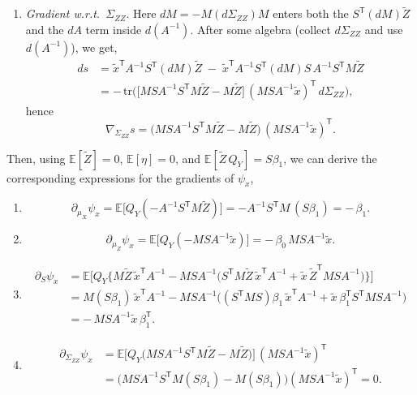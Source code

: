 \documentclass[12pt]{article}
\newcommand{\E}{\mathbb{E}}
\newcommand{\T}{\mathsf{T}} %
\begin{document}
\begin{enumerate}
 \item \textit{Gradient w.r.t.\ $\Sigma_{ZZ}$}.
Here $dM=-M(d\Sigma_{ZZ})M$ enters both the $S^{\T}(dM)\widetilde Z$ and the $dA$ term inside $d(A^{-1})$. After some algebra (collect $d\Sigma_{ZZ}$ and use $d(A^{-1})$), we get,
\begin{align*}
ds
&= \tilde x^{\T}A^{-1}S^{\T}(dM)\widetilde Z
\;-\;\tilde x^{\T}A^{-1}S^{\T}(dM)S\,A^{-1} S^{\T}M\widetilde Z\\
&= -\,\mathrm{tr}\!\Big( \big[M S A^{-1} S^{\T}M\widetilde Z - M\widetilde Z\big]\,(M S A^{-1}\tilde x)^{\T}\, d\Sigma_{ZZ}\Big),
\end{align*}
hence
\[
\boxed{\;\nabla_{\Sigma_{ZZ}} s
= \big(M S A^{-1} S^{\T}M\widetilde Z - M\widetilde Z\big)\,(M S A^{-1}\tilde x)^{\T}.\;}
\]
\end{enumerate}

Then, using $\E[\widetilde Z]=0$, $\E[\eta]=0$, and $\E[\widetilde Z\,Q_Y]=S\beta_1$, we can derive the corresponding expressions for the gradients of $\psi_x$,

\begin{enumerate}
\item \[
\partial_{\mu_X}\psi_x
= \E\big[Q_Y(-A^{-1}S^{\T}M\widetilde Z)\big]
= -A^{-1}S^{\T}M\,(S\beta_1) = -\,\beta_1.
\]

\item \[
\partial_{\mu_Z}\psi_x
= \E\big[Q_Y(-M S A^{-1}\tilde x)\big]
= -\,\beta_0\,M S A^{-1}\tilde x.
\]

\item \begin{align*}
\partial_{S}\psi_x
&= \E\Big[Q_Y\Big\{M\widetilde Z\,\tilde x^{\T}A^{-1}
- M S A^{-1}\big(S^{\T}M\widetilde Z\,\tilde x^{\T}A^{-1}+\tilde x\,\widetilde Z^{\T} M S A^{-1}\big)\Big\}\Big]\\
&= M(S\beta_1)\,\tilde x^{\T}A^{-1}
- M S A^{-1}\Big((S^{\T}MS)\beta_1\,\tilde x^{\T}A^{-1}+\tilde x\,\beta_1^{\T}S^{\T}MS A^{-1}\Big)\\
&= -\,M S A^{-1}\tilde x\,\beta_1^{\T}.
\end{align*}

\item \begin{align*}
\partial_{\Sigma_{ZZ}}\psi_x
& = \E\!\big[Q_Y\big(M S A^{-1} S^{\T}M\widetilde Z - M\widetilde Z\big)\big]\,(M S A^{-1}\tilde x)^{\T} \\
& = \big(M S A^{-1}S^{\T}M(S\beta_1)-M(S\beta_1)\big)(M S A^{-1}\tilde x)^{\T}
= 0.
\end{align*}
\end{enumerate}
\end{document}

